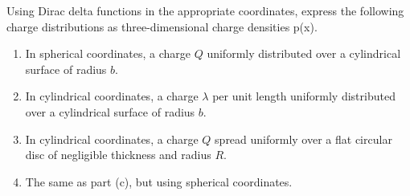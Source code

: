 \begin{question}
  Using Dirac delta functions in the appropriate coordinates, express
  the following charge distributions as three-dimensional charge
  densities p(x).

  \begin{enumerate}[label=\alph*]

    \item In spherical coordinates, a charge $Q$ uniformly distributed
      over a cylindrical surface of radius $b$.

    \item In cylindrical coordinates, a charge $\lambda$ per unit
      length uniformly distributed over a cylindrical surface of
      radius $b$.

    \item In cylindrical coordinates, a charge $Q$ spread uniformly
      over a flat circular disc of negligible thickness and radius
      $R$.

    \item The same as part (c), but using spherical coordinates.
  \end{enumerate}

\end{question}
